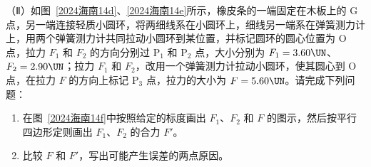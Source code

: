 \documentclass[\gkver]{gaokaozhenti}
\begin{document}
\begin{enumerate}
（Ⅱ）如图~\ref{2024海南14d}、\ref{2024海南14e}所示，橡皮条的一端固定在木板上的 G 点，另一端连接轻质小圆环，将两细线系在小圆环上，细线另一端系在弹簧测力计上，用两个弹簧测力计共同拉动小圆环到某位置，并标记圆环的圆心位置为 O 点，拉力 $F_{1}$ 和 $F_{2}$ 的方向分别过 P$_{1}$ 和 P$_{2}$ 点，大小分别为 $F_{1} = 3.60 \UN$、$F_{2} = 2.90 \UN$；拉力 $F_{1}$ 和 $F_{2}$，改用一个弹簧测力计拉动小圆环，使其圆心到 O 点，在拉力 $F$ 的方向上标记 P$_{3}$ 点，拉力的大小为 $F = 5.60 \UN$。请完成下列问题：
\begin{enumerate}
	\item
	在图~\ref{2024海南14f}中按照给定的标度画出 $F_{1}$、$F_{2}$ 和 $F$ 的图示，然后按平行四边形定则画出 $F_{1}$、$F_{2}$ 的合力 $F'$。
	\item
	比较 $F$ 和 $F'$，写出可能产生误差的两点原因\tkanswer[3.0cm]{}。
\end{enumerate}


\end{enumerate}
\end{document}

